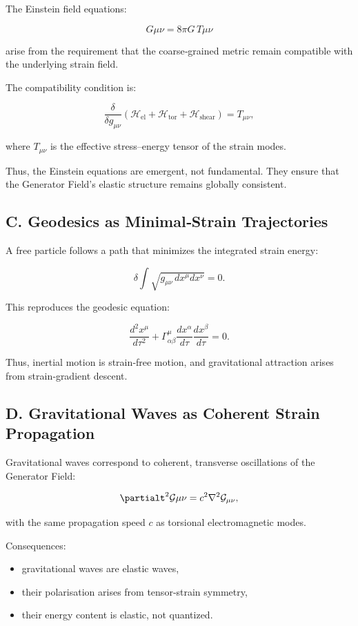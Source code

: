\documentclass[reprint,amsmath,amssymb,aps,prl,floatfix]{revtex4-2}
\begin{document}
\begin{itemize}
The Einstein field equations:

\[
G{\mu\nu} = 8\pi G\,T{\mu\nu}
\]

arise from the requirement that the coarse‑grained metric remain compatible with the underlying strain field.
\medskip

The compatibility condition is:

\[
\frac{\delta}{\delta g_{\mu\nu}}
\left(
\mathcal{H}_{\mathrm{el}}
+
\mathcal{H}_{\mathrm{tor}}
+
\mathcal{H}_{\mathrm{shear}}
\right)
=
T_{\mu\nu},
\]

where \(T_{\mu\nu}\) is the effective stress–energy tensor of the strain modes.
\medskip

Thus, the Einstein equations are emergent, not fundamental.  
They ensure that the Generator Field’s elastic structure remains globally consistent.

\subsection{C. Geodesics as Minimal‑Strain Trajectories}

A free particle follows a path that minimizes the integrated strain energy:

\[
\delta \int \sqrt{g_{\mu\nu}\,dx^\mu dx^\nu} = 0.
\]

This reproduces the geodesic equation:

\[
\frac{d^2 x^\mu}{d\tau^2}
+
\Gamma^\mu_{\alpha\beta}
\frac{dx^\alpha}{d\tau}
\frac{dx^\beta}{d\tau}
= 0.
\]

Thus, inertial motion is strain‑free motion, and gravitational attraction arises from strain‑gradient descent.

\subsection{D. Gravitational Waves as Coherent Strain Propagation}

Gravitational waves correspond to coherent, transverse oscillations of the Generator Field:

\[
\partialt^2 \mathcal{G}{\mu\nu}
=
c^2 \nabla^2 \mathcal{G}_{\mu\nu},
\]

with the same propagation speed \(c\) as torsional electromagnetic modes.

Consequences:
\begin{itemize}
\item gravitational waves are elastic waves,  
\item their polarisation arises from tensor‑strain symmetry,  
\item their energy content is elastic, not quantized.
\end{itemize}


\end{itemize}
\end{document}
